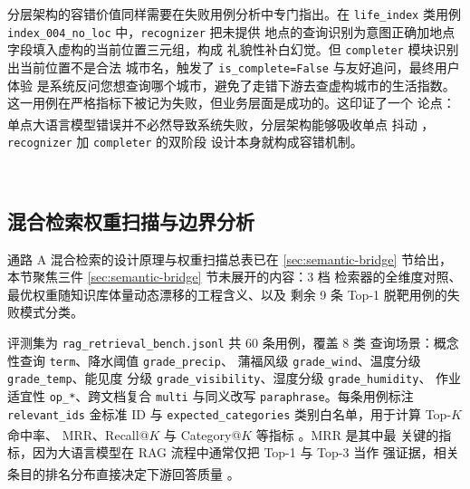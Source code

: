 \documentclass[a4paper]{article}
\theoremstyle{definition}
\theoremstyle{plain}
\theoremstyle{remark}
\newcommand{\reffig}[1]{图 \ref{#1}}
\newcommand{\reftab}[1]{表 \ref{#1}}
\let\oldcite\cite
\renewcommand{\cite}[1]{\textsuperscript{\oldcite{#1}}}
\newcommand{\bk}{\discretionary{}{}{}}
\begin{document}
分层架构的容错价值同样需要在失败用例分析中专门指出。在 \texttt{life\_\bk{}index}
类用例 \texttt{index\_\bk{}004\_\bk{}no\_\bk{}loc} 中，\texttt{recognizer} 把未提供
地点的查询识别为意图正确加地点字段填入虚构的当前位置三元组，构成
礼貌性补白幻觉。但 \texttt{completer} 模块识别出当前位置不是合法
城市名，触发了 \texttt{is\_\bk{}complete=\bk{}False} 与友好追问，最终用户体验
是系统反问您想查询哪个城市，避免了走错下游去查虚构城市的生活指数。
这一用例在严格指标下被记为失败，但业务层面是成功的。这印证了一个
论点：单点大语言模型错误并不必然导致系统失败，分层架构能够吸收单点
抖动 \cite{ref10}，\texttt{recognizer} 加 \texttt{completer} 的双阶段
设计本身就构成容错机制。


﻿%

\subsection{混合检索权重扫描与边界分析}
\label{sec:rag-eval}

通路 A 混合检索的设计原理与权重扫描总表已在 \ref{sec:semantic-bridge}
节给出，本节聚焦三件 \ref{sec:semantic-bridge} 节未展开的内容：3 档
检索器的全维度对照、最优权重随知识库体量动态漂移的工程含义、以及
剩余 9 条 Top-1 脱靶用例的失败模式分类。

评测集为 \texttt{rag\_\bk{}retrieval\_\bk{}bench.\bk{}jsonl} 共 60 条用例，覆盖 8 类
查询场景：概念性查询 \texttt{term}、降水阈值 \texttt{grade\_\bk{}precip}、
蒲福风级 \texttt{grade\_\bk{}wind}、温度分级 \texttt{grade\_\bk{}temp}、能见度
分级 \texttt{grade\_\bk{}visibility}、湿度分级 \texttt{grade\_\bk{}humidity}、
作业适宜性 \texttt{op\_\bk{}*}、跨文档复合 \texttt{multi} 与同义改写
\texttt{paraphrase}。每条用例标注 \texttt{relevant\_\bk{}ids} 金标准 ID
与 \texttt{expected\_\bk{}categories} 类别白名单，用于计算 Top-$K$ 命中率、
MRR、Recall@$K$ 与 Category@$K$ 等指标 \cite{ref24}。MRR 是其中最
关键的指标，因为大语言模型在 RAG 流程中通常仅把 Top-1 与 Top-3 当作
强证据，相关条目的排名分布直接决定下游回答质量 \cite{ref12}。
\end{document}
